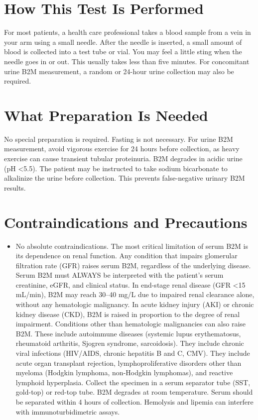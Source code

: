 \section*{How This Test Is Performed}
For most patients, a health care professional takes a blood sample from a vein in your arm using a small needle. After the needle is inserted, a small amount of blood is collected into a test tube or vial. You may feel a little sting when the needle goes in or out. This usually takes less than five minutes. For concomitant urine B2M measurement, a random or 24-hour urine collection may also be required.

\section*{What Preparation Is Needed}
No special preparation is required. Fasting is not necessary. For urine B2M measurement, avoid vigorous exercise for 24 hours before collection, as heavy exercise can cause transient tubular proteinuria. B2M degrades in acidic urine (pH <5.5). The patient may be instructed to take sodium bicarbonate to alkalinize the urine before collection. This prevents false-negative urinary B2M results.

\section*{Contraindications and Precautions}
\begin{itemize}
  \item No absolute contraindications. The most critical limitation of serum B2M is its dependence on renal function. Any condition that impairs glomerular filtration rate (GFR) raises serum B2M, regardless of the underlying disease. Serum B2M must ALWAYS be interpreted with the patient's serum creatinine, eGFR, and clinical status. In end-stage renal disease (GFR <15 mL/min), B2M may reach 30--40 mg/L due to impaired renal clearance alone, without any hematologic malignancy. In acute kidney injury (AKI) or chronic kidney disease (CKD), B2M is raised in proportion to the degree of renal impairment. Conditions other than hematologic malignancies can also raise B2M. These include autoimmune diseases (systemic lupus erythematosus, rheumatoid arthritis, Sjogren syndrome, sarcoidosis). They include chronic viral infections (HIV/AIDS, chronic hepatitis B and C, CMV). They include acute organ transplant rejection, lymphoproliferative disorders other than myeloma (Hodgkin lymphoma, non-Hodgkin lymphomas), and reactive lymphoid hyperplasia. Collect the specimen in a serum separator tube (SST, gold-top) or red-top tube. B2M degrades at room temperature. Serum should be separated within 4 hours of collection. Hemolysis and lipemia can interfere with immunoturbidimetric assays.
\end{itemize}
